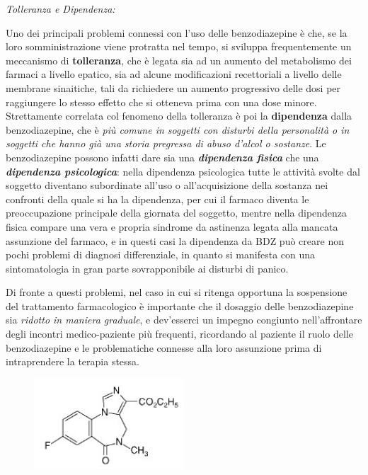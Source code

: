 \begin{itemize}
\emph{\emph{Tolleranza e Dipendenza:}}

Uno dei principali problemi connessi con l'uso delle benzodiazepine è
che, se la loro somministrazione viene protratta nel tempo, si sviluppa
frequentemente un meccanismo di \textbf{tolleranza}, che è legata sia ad
un aumento del metabolismo dei farmaci a livello epatico, sia ad alcune
modificazioni recettoriali a livello delle membrane sinaitiche, tali da
richiedere un aumento progressivo delle dosi per raggiungere lo stesso
effetto che si otteneva prima con una dose minore. Strettamente
correlata col fenomeno della tolleranza è poi la \textbf{dipendenza}
dalla benzodiazepine, che è \emph{più comune in soggetti con disturbi
della personalità o in soggetti che hanno già una storia pregressa di
abuso d'alcol o sostanze}. Le benzodiazepine possono infatti dare sia
una \textbf{\emph{dipendenza fisica}} che una \textbf{\emph{dipendenza
psicologica}}: nella dipendenza psicologica tutte le attività svolte dal
soggetto diventano subordinate all'uso o all'acquisizione della sostanza
nei confronti della quale si ha la dipendenza, per cui il farmaco
diventa le preoccupazione principale della giornata del soggetto, mentre
nella dipendenza fisica compare una vera e propria sindrome da astinenza
legata alla mancata assunzione del farmaco, e in questi casi la
dipendenza da BDZ può creare non pochi problemi di diagnosi
differenziale, in quanto si manifesta con una sintomatologia in gran
parte sovrapponibile ai disturbi di panico.

Di fronte a questi problemi, nel caso in cui si ritenga opportuna la
sospensione del trattamento farmacologico è importante che il dosaggio
delle benzodiazepine sia \emph{ridotto in maniera graduale}, e
dev'esserci un impegno congiunto nell'affrontare degli incontri
medico-paziente più frequenti, ricordando al paziente il ruolo delle
benzodiazepine e le problematiche connesse alla loro assunzione prima di
intraprendere la terapia stessa.

\begin{figure}[!ht]
\centering
	\includegraphics[width=0.5\textwidth]{04/image2.jpeg}
\end{figure}


\end{itemize}
